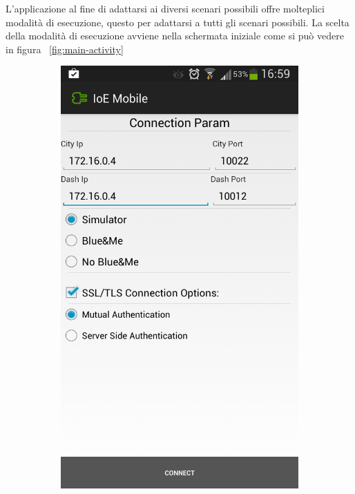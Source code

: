 L'applicazione al fine di adattarsi ai diversi scenari possibili offre molteplici modalità di esecuzione, questo per adattarsi a tutti gli scenari possibili. La scelta della modalità di esecuzione avviene nella schermata iniziale come si può vedere in figura ~\ref{fig:main-activity}


\begin{figure}
	\centering
	\begin{subfigure}{0.45\textwidth}
		\includegraphics[width=\textwidth]{assets/mobile-app-main.png}

\end{subfigure}
\end{figure}
